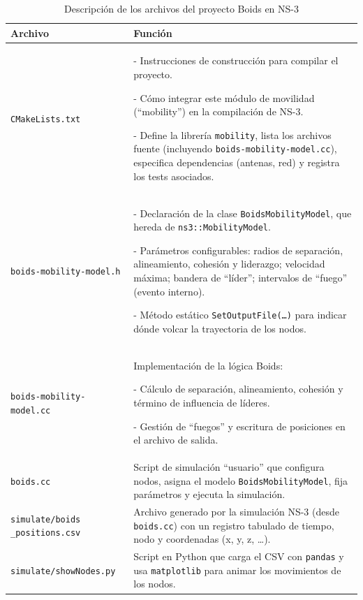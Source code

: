 \documentclass{article}
\begin{document}
\begin{table}[ht]
  \centering
  \begin{tabular}{p{4cm} p{10cm}}
    \toprule
    \textbf{Archivo} & \textbf{Función} \\
    \midrule
    \texttt{CMakeLists.txt} &
      - Instrucciones de construcción para compilar el proyecto.

      - Cómo integrar este módulo de movilidad (“mobility”) en la compilación de NS-3.

      - Define la librería \texttt{mobility}, lista los archivos fuente (incluyendo \texttt{boids-mobility-model.cc}), especifica dependencias (antenas, red) y registra los tests asociados.
    \\
    \addlinespace
    \texttt{boids-mobility-model.h} &
      - Declaración de la clase \texttt{BoidsMobilityModel}, que hereda de \texttt{ns3::MobilityModel}.

      - Parámetros configurables: radios de separación, alineamiento, cohesión y liderazgo; velocidad máxima; bandera de “líder”; intervalos de “fuego” (evento interno).

      - Método estático \texttt{SetOutputFile(\dots)} para indicar dónde volcar la trayectoria de los nodos.
    \\
    \addlinespace
    \texttt{boids-mobility-model.cc} &
      Implementación de la lógica Boids:

          - Cálculo de separación, alineamiento, cohesión y término de influencia de líderes.

          - Gestión de “fuegos” y escritura de posiciones en el archivo de salida.
    \\
    \addlinespace
    \texttt{boids.cc} &
    Script de simulación “usuario” que configura nodos, asigna el modelo \texttt{BoidsMobilityModel}, fija parámetros y ejecuta la simulación.
    \\
    \addlinespace
    \texttt{simulate/boids \_positions.csv} &
    Archivo generado por la simulación NS-3 (desde \texttt{boids.cc}) con un registro tabulado de tiempo, nodo y coordenadas (x, y, z, …).
    \\
    \addlinespace
    \texttt{simulate/showNodes.py} &
    Script en Python que carga el CSV con \texttt{pandas} y usa \texttt{matplotlib} para animar los movimientos de los nodos.
    \\
    \bottomrule
  \end{tabular}
  \caption{Descripción de los archivos del proyecto Boids en NS-3}
  \label{tab:boids_files}
\end{table}
\end{document}
